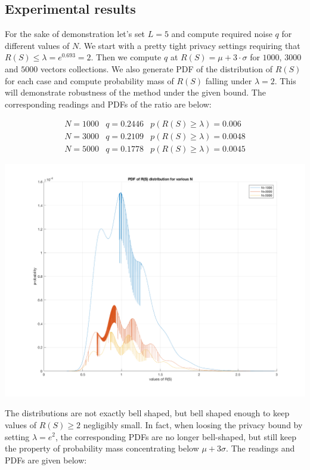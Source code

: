 \documentclass[11pt]{article}
\begin{document}
\subsection{Experimental results}
 
 For the sake of demonstration let's set $L=5$ and compute required noise $q$ for different values of $N$.
 We start with a pretty tight privacy settings requiring that $R(S) \le \lambda = e^{0.693} = 2$.  Then we compute $q$ at $R(S) = \mu + 3\cdot \sigma$ for $1000$, $3000$ and $5000$ vectors collections.  We also generate PDF of the distribution of $R(S)$ for each case and compute probability mass of $R(S)$ falling under $\lambda = 2$.  This will demonstrate robustness of the method under the given bound.  The corresponding readings and PDFs of the ratio are below:  
 
 \[
  \begin{matrix}N = 1000 & q = 0.2446 & p(R(S) \ge \lambda) = 0.006 \\
  N= 3000 & q = 0.2109 & p(R(S) \ge \lambda) = 0.0048  \\
  N=5000 & q = 0.1778 & p(R(S) \ge \lambda) =0.0045 \end{matrix} 
 \]
 
\includegraphics[scale =  0.25]{xyz.png}
 
 The distributions are not exactly bell shaped, but bell shaped enough to keep values of $R(S) \ge 2$ negligibly small. In fact, when loosing the privacy bound by setting  $\lambda = e^2$, the corresponding PDFs  are no longer bell-shaped, but still keep the property of probability mass concentrating below $\mu + 3\sigma$.   The readings and PDFs are given below:
 
\end{document}

